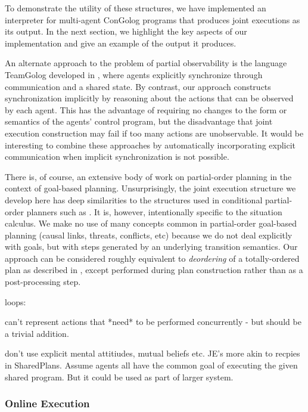 To demonstrate the utility of these structures, we have implemented
an interpreter for multi-agent ConGolog programs that produces joint
executions as its output. In the next section, we highlight the key
aspects of our implementation and give an example of the output it
produces.

An alternate approach to the problem of partial observability is the
language TeamGolog developed in \citep{farinelli07team_golog}, where
agents explicitly synchronize through communication and a shared state.
By contrast, our approach constructs synchronization implicitly by
reasoning about the actions that can be observed by each agent. This
has the advantage of requiring no changes to the form or semantics
of the agents' control program, but the disadvantage that joint execution
construction may fail if too many actions are unobservable. It would
be interesting to combine these approaches by automatically incorporating
explicit communication when implicit synchronization is not possible.

There is, of course, an extensive body of work on partial-order planning
in the context of goal-based planning. Unsurprisingly, the joint execution
structure we develop here has deep similarities to the structures
used in conditional partial-order planners such as \citep{peot92conditional_nonlinear}.
It is, however, intentionally specific to the situation calculus.
We make no use of many concepts common in partial-order goal-based
planning (causal links, threats, conflicts, etc) because we do not
deal explicitly with goals, but with steps generated by an underlying
transition semantics. Our approach can be considered roughly equivalent
to \emph{deordering} of a totally-ordered plan as described in \citep{backstrom99reordering},
except performed during plan construction rather than as a post-processing
step.

loops: \citep{levesque96what_is_planning,levesque05planning_with_loops}

can't represent actions that {*}need{*} to be performed concurrently
- but should be a trivial addition.

don't use explicit mental attitiudes, mutual beliefs etc. JE's more
akin to recpies in SharedPlans. Assume agents all have the common
goal of executing the given shared program. But it could be used as
part of larger system.


\subsubsection{Online Execution}

